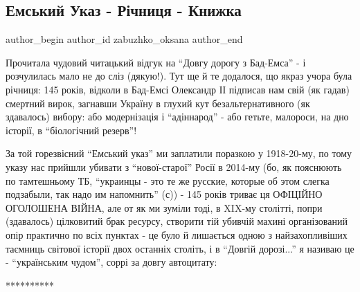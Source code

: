 
 
 
 
 
 
\subsection{Емський Указ - Річниця - Книжка}
\label{sec:31_05_2021.fb.zabuzhko_oksana.1.emskij_ukaz_kniga}
\ifcmt
 author_begin
   author_id zabuzhko_oksana
 author_end
\fi

Прочитала чудовий читацький відгук на \enquote{Довгу дорогу з Бад-Емса} - і розчулилась
мало не до сліз (дякую!). Тут ще й те додалося, що якраз учора була річниця:
145 років, відколи в Бад-Емсі Олександр ІІ підписав нам свій (як гадав)
смертний вирок, загнавши Україну в глухий кут безальтернативного (як здавалось)
вибору: або модернізація і \enquote{адіннарод} - або гетьте, малороси, на дно історії,
в \enquote{біологічний резерв}! 

За той горезвісний \enquote{Емський указ} ми заплатили поразкою у 1918-20-му, по тому
указу нас прийшли убивати з \enquote{нової-старої} Росії в 2014-му (бо, як пояснюють по
тамтешньому ТБ, \enquote{украинцы - это те же русские, которые об этом слегка
подзабыли, так надо им напомнить} (с)) - 145 років триває ця ОФІЦІЙНО ОГОЛОШЕНА
ВІЙНА, але от як ми зуміли тоді, в XIX-му столітті, попри (здавалось)
цілковитий брак ресурсу, створити тій убивчій махині організований опір
практично по всіх пунктах - це було й лишається одною з найзахопливіших
таємниць світової історії двох останніх століть, і в \enquote{Довгій дорозі...} я
називаю це - \enquote{українським чудом}, соррі за довгу автоцитату:

**********

